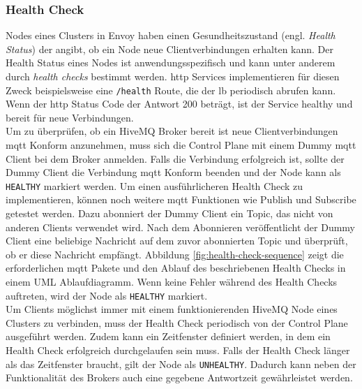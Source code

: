 \subsubsection{Health Check} \label{ss:health-check}
Nodes eines Clusters in Envoy haben einen Gesundheitszustand (engl. \textit{Health Status}) der angibt, ob ein Node neue Clientverbindungen erhalten kann.
Der Health Status eines Nodes ist anwendungsspezifisch und kann unter anderem durch \textit{health checks} bestimmt werden.
\ac{http} Services implementieren für diesen Zweck beispielsweise eine \verb|/health| Route, die der \acl{lb} periodisch abrufen kann. Wenn der \ac{http} Status Code der Antwort 200 beträgt, ist der Service healthy und bereit für neue Verbindungen.
\\
Um zu überprüfen, ob ein HiveMQ Broker bereit ist neue Clientverbindungen \ac{mqtt} Konform anzunehmen, muss sich die Control Plane mit einem Dummy \ac{mqtt} Client bei dem Broker anmelden. Falls die Verbindung erfolgreich ist, sollte der Dummy Client die Verbindung \ac{mqtt} Konform beenden und der Node kann als \verb|HEALTHY| markiert werden.
Um einen ausführlicheren Health Check zu implementieren, können noch weitere \ac{mqtt} Funktionen wie Publish und Subscribe getestet werden. Dazu abonniert der Dummy Client ein Topic, das nicht von anderen Clients verwendet wird. Nach dem Abonnieren veröffentlicht der Dummy Client eine beliebige Nachricht auf dem zuvor abonnierten Topic und überprüft, ob er diese Nachricht empfängt. Abbildung \ref{fig:health-check-sequence} zeigt die erforderlichen \ac{mqtt} Pakete und den Ablauf des beschriebenen Health Checks in einem UML Ablaufdiagramm. Wenn keine Fehler während des Health Checks auftreten, wird der Node als \verb|HEALTHY| markiert.
\\
Um Clients möglichst immer mit einem funktionierenden HiveMQ Node eines Clusters zu verbinden, muss der Health Check periodisch von der Control Plane ausgeführt werden.
Zudem kann ein Zeitfenster definiert werden, in dem ein Health Check erfolgreich durchgelaufen sein muss. Falls der Health Check länger als das Zeitfenster braucht, gilt der Node als \verb|UNHEALTHY|. Dadurch kann neben der Funktionalität des Brokers auch eine gegebene Antwortzeit gewährleistet werden.
